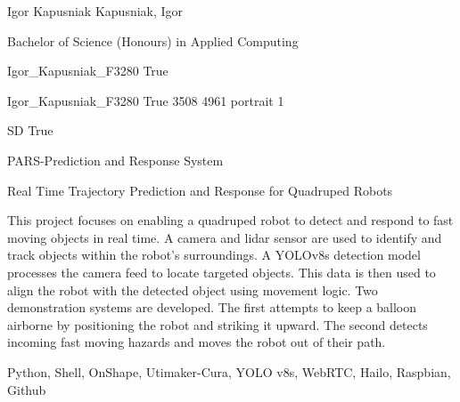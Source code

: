 \documentclass[twoside]{report}
\begin{document}
\begingroup{}\relax



\def\Key{Igor_Kapusniak_F3280}

{Igor Kapusniak}
{Kapusniak, Igor}

{Bachelor of Science (Honours) in Applied Computing}

{Igor_Kapusniak_F3280}
{True}

{Igor_Kapusniak_F3280}
{True}
{3508}
{4961}
{portrait}
{1}

{SD}
{True}

{PARS-Prediction and Response System}

{Real Time Trajectory Prediction and Response for Quadruped Robots}

{This project focuses on enabling a quadruped robot to detect and respond to fast moving objects in real time. A camera and lidar sensor are used to identify and track objects within the robot's surroundings. A YOLOv8s detection model processes the camera feed to locate targeted objects. This data is then used to align the robot with the detected object using movement logic. Two demonstration systems are developed. The first attempts to keep a balloon airborne by positioning the robot and striking it upward. The second detects incoming fast moving hazards and moves the robot out of their path.}

{Python, Shell, OnShape, Utimaker-Cura, YOLO v8s, WebRTC, Hailo, Raspbian, Github}
\end{document}

